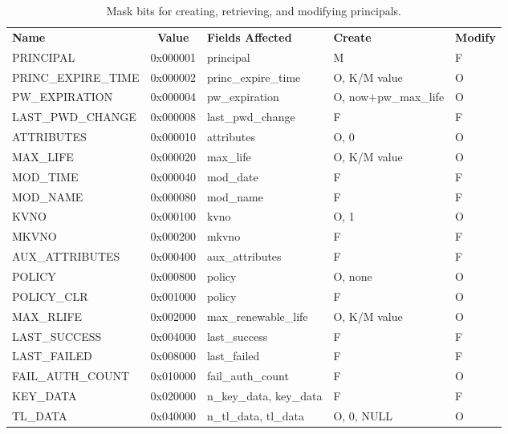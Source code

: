 \begin{table}[htbp]
\begin{tabular}{@{}lclll}
{\bf Name} & {\bf Value} & {\bf Fields Affected} & {\bf Create} &
        {\bf Modify} \\
PRINCIPAL               & 0x000001 & principal & M & F \\
PRINC_EXPIRE_TIME       & 0x000002 & princ_expire_time & O, K/M value & O \\
PW_EXPIRATION           & 0x000004 & pw_expiration & O, now+pw_max_life & O \\
LAST_PWD_CHANGE         & 0x000008 & last_pwd_change & F & F \\
ATTRIBUTES              & 0x000010 & attributes & O, 0 & O \\
MAX_LIFE                & 0x000020 & max_life & O, K/M value & O \\
MOD_TIME                & 0x000040 & mod_date & F & F \\
MOD_NAME                & 0x000080 & mod_name & F & F \\
KVNO                    & 0x000100 & kvno & O, 1 & O \\
MKVNO                   & 0x000200 & mkvno & F & F \\
AUX_ATTRIBUTES          & 0x000400 & aux_attributes & F & F \\
POLICY                  & 0x000800 & policy & O, none & O \\
POLICY_CLR              & 0x001000 & policy & F & O \\
MAX_RLIFE               & 0x002000 & max_renewable_life & O, K/M value & O \\
LAST_SUCCESS            & 0x004000 & last_success & F & F \\
LAST_FAILED             & 0x008000 & last_failed & F & F \\
FAIL_AUTH_COUNT         & 0x010000 & fail_auth_count & F & O \\
KEY_DATA                & 0x020000 & n_key_data, key_data & F & F \\
TL_DATA                 & 0x040000 & n_tl_data, tl_data & O, 0, NULL & O
\end{tabular}
\caption{Mask bits for creating, retrieving, and modifying principals.}
\label{tab:princ-bits}
\end{table}


